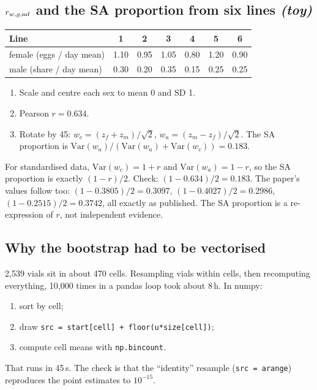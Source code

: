 \subsection{$r_{w,g,\mathrm{mf}}$ and the SA proportion from six lines \emph{(toy)}}
\begin{center}\begin{tabular}{lcccccc}\toprule
Line & 1 & 2 & 3 & 4 & 5 & 6\\\midrule
female (eggs / day mean) & 1.10 & 0.95 & 1.05 & 0.80 & 1.20 & 0.90\\
male (share / day mean) & 0.30 & 0.20 & 0.35 & 0.15 & 0.25 & 0.25\\\bottomrule
\end{tabular}\end{center}
\begin{enumerate}
\item Scale and centre each sex to mean 0 and SD 1.
\item Pearson $r=0.634$.
\item \label{ex:rot}Rotate by 45\textdegree: $w_c=(z_f+z_m)/\sqrt2$, $w_a=(z_m-z_f)/\sqrt2$. The SA proportion is $\mathrm{Var}(w_a)/(\mathrm{Var}(w_a)+\mathrm{Var}(w_c))=0.183$.
\end{enumerate}
\begin{keybox}
For standardised data, $\mathrm{Var}(w_c)=1+r$ and $\mathrm{Var}(w_a)=1-r$, so the SA proportion is exactly $(1-r)/2$. Check: $(1-0.634)/2=0.183$. The paper's values follow too: $(1-0.3805)/2=0.3097$, $(1-0.4027)/2=0.2986$, $(1-0.2515)/2=0.3742$, all exactly as published. The SA proportion is a re-expression of $r$, not independent evidence.
\end{keybox}

\subsection{Why the bootstrap had to be vectorised}
2,539 vials sit in about 470 cells. Resampling vials within cells, then recomputing everything, 10,000 times in a pandas loop took about 8\,h. In numpy:
\begin{enumerate}
\item sort by cell;
\item draw \texttt{src = start[cell] + floor(u*size[cell])};
\item compute cell means with \texttt{np.bincount}.
\end{enumerate}
That runs in 45\,s. The check is that the ``identity'' resample (\texttt{src = arange}) reproduces the point estimates to $10^{-15}$.

